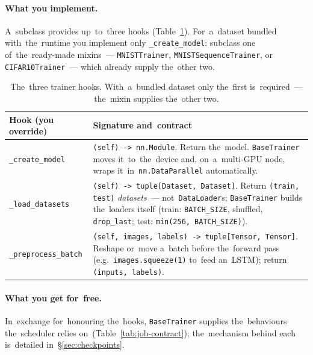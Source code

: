 \paragraph{What you implement.}  A~subclass provides up~to~three hooks
(Table~\ref{tab:trainer-hooks}).  For~a~dataset bundled with~the~runtime you
implement only \texttt{\_create\_model}: subclass one of~the~ready-made
mixins~--- \texttt{MNISTTrainer}, \texttt{MNISTSequenceTrainer}, or
\texttt{CIFAR10Trainer}~--- which already supply the~other two.

\begin{table}[H]
\centering\small
\begin{tabularx}{\textwidth}{@{}l >{\raggedright\arraybackslash}X@{}}
\toprule
\textbf{Hook (you override)} & \textbf{Signature and~contract} \\
\midrule
\texttt{\_create\_model}     & \texttt{(self) -> nn.Module}.  Return the~model.  \texttt{BaseTrainer} moves it~to~the~device and, on~a~multi-GPU node, wraps it~in~\texttt{nn.DataParallel} automatically. \\
\addlinespace
\texttt{\_load\_datasets}    & \texttt{(self) -> tuple[Dataset, Dataset]}.  Return \texttt{(train, test)} \emph{datasets}~--- not~\texttt{DataLoader}s; \texttt{BaseTrainer} builds the~loaders itself (train: \texttt{BATCH\_SIZE}, shuffled, \texttt{drop\_last}; test: \texttt{min(256, BATCH\_SIZE)}). \\
\addlinespace
\texttt{\_preprocess\_batch} & \texttt{(self, images, labels) -> tuple[Tensor, Tensor]}.  Reshape or~move a~batch before the~forward pass (e.g.\ \texttt{images.squeeze(1)} to~feed an~LSTM); return \texttt{(inputs, labels)}. \\
\bottomrule
\end{tabularx}
\caption{The~three trainer hooks.  With~a~bundled dataset only the~first
is~required~--- the~mixin supplies the~other two.}\label{tab:trainer-hooks}
\end{table}

\paragraph{What you get for~free.}  In~exchange for~honouring the~hooks,
\texttt{BaseTrainer} supplies the~behaviours the~scheduler relies
on~(Table~\ref{tab:job-contract}); the~mechanism behind each is~detailed
in~\S\ref{sec:checkpoints}.

